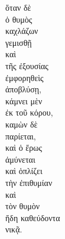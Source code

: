 

{\large
\begin{greek}
\noindent ὅταν δὲ \\
ὁ θυμὸς \\
\tabto{2em} καχλάζων \\
γεμισθῇ \\
καὶ \\
\tabto{2em} τῆς ἐξουσίας \\
ἐμφορηθεὶς \\
ἀποβλύσῃ, \\
κάμνει μὲν \\
\tabto{2em} ἐκ τοῦ κόρου, \\
καμὼν δὲ \\
παρίεται, \\
καὶ ὁ ἔρως \\
ἀμύνεται \\
καὶ ὁπλίζει \\
τὴν ἐπιθυμίαν \\
καὶ \\
τὸν θυμὸν \\
\tabto{2em} ἤδη καθεύδοντα \\
νικᾷ.\\

\end{greek}
}

